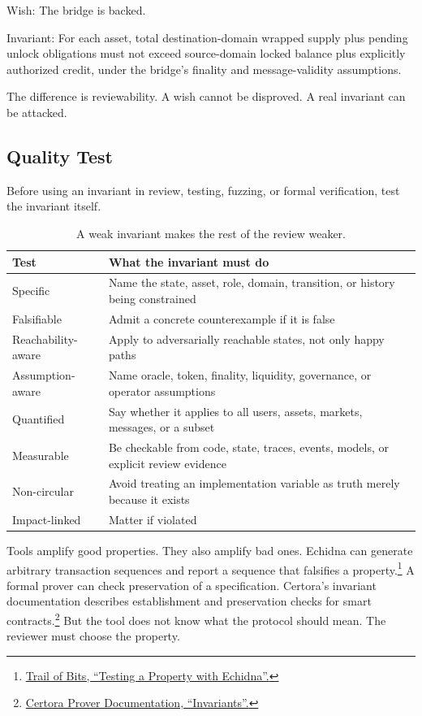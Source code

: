 \begin{codeblock}
Wish:
    The bridge is backed.

Invariant:
    For each asset, total destination-domain wrapped supply plus
    pending unlock obligations must not exceed source-domain locked
    balance plus explicitly authorized credit, under the bridge's
    finality and message-validity assumptions.
\end{codeblock}

The difference is reviewability. A wish cannot be disproved. A real invariant can be attacked.

\subsection{Quality Test}

Before using an invariant in review, testing, fuzzing, or formal verification, test the invariant itself.

\begin{table}[htbp]
\centering
\small
\renewcommand{\arraystretch}{1.18}
\begin{tabularx}{\textwidth}{@{}>{\RaggedRight\arraybackslash}p{}X@{}}
\toprule
Test & What the invariant must do \\
\midrule
Specific & Name the state, asset, role, domain, transition, or history being constrained \\
Falsifiable & Admit a concrete counterexample if it is false \\
Reachability-aware & Apply to adversarially reachable states, not only happy paths \\
Assumption-aware & Name oracle, token, finality, liquidity, governance, or operator assumptions \\
Quantified & Say whether it applies to all users, assets, markets, messages, or a subset \\
Measurable & Be checkable from code, state, traces, events, models, or explicit review evidence \\
Non-circular & Avoid treating an implementation variable as truth merely because it exists \\
Impact-linked & Matter if violated \\
\bottomrule
\end{tabularx}
\caption{A weak invariant makes the rest of the review weaker.}
\end{table}

Tools amplify good properties. They also amplify bad ones. Echidna can generate arbitrary transaction sequences and report a sequence that falsifies a property.\footnote{\href{https://secure-contracts.com/program-analysis/echidna/introduction/how-to-test-a-property.html}{Trail of Bits, ``Testing a Property with Echidna''.}} A formal prover can check preservation of a specification. Certora's invariant documentation describes establishment and preservation checks for smart contracts.\footnote{\href{https://docs.certora.com/en/latest/docs/cvl/invariants.html}{Certora Prover Documentation, ``Invariants''.}} But the tool does not know what the protocol should mean. The reviewer must choose the property.

